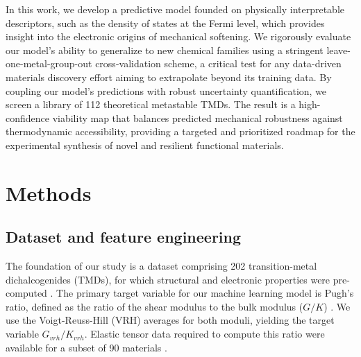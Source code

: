 \documentclass[]{article}
\begin{document}
In this work, we develop a predictive model founded on physically interpretable descriptors, such as the density of states at the Fermi level, which provides insight into the electronic origins of mechanical softening.\citep{Duan_2025,chen2025universalmaterialpropertyprediction,Zhang_2023} We rigorously evaluate our model's ability to generalize to new chemical families using a stringent leave-one-metal-group-out cross-validation scheme, a critical test for any data-driven materials discovery effort aiming to extrapolate beyond its training data.\citep{veillon2025chemicallygroundedevaluationframework} By coupling our model's predictions with robust uncertainty quantification\citep{Guan_2019}, we screen a library of 112 theoretical metastable TMDs.\citep{park2024exploring,Gou_2024} The result is a high-confidence viability map that balances predicted mechanical robustness against thermodynamic accessibility, providing a targeted and prioritized roadmap for the experimental synthesis of novel and resilient functional materials.\citep{park2024exploring,Duan_2025,Zhang_2023,Gou_2024,Gao_2025}

\section{Methods}
\label{sec:methods}
\subsection{Dataset and feature engineering}
The foundation of our study is a dataset comprising 202 transition-metal dichalcogenides (TMDs), for which structural and electronic properties were pre-computed \citep{muller2023open,Ramanathan_2023,chen2021leveraginglargescalecomputationaldatabase}. The primary target variable for our machine learning model is Pugh's ratio, defined as the ratio of the shear modulus to the bulk modulus ($G/K$) \citep{dejong2018statistical,malakar2022datadrivenmachinelearningpredict,Ali_2024}. We use the Voigt-Reuss-Hill (VRH) averages for both moduli, yielding the target variable $G_{vrh}/K_{vrh}$. Elastic tensor data required to compute this ratio were available for a subset of 90 materials \citep{dejong2018statistical,Choudhary_2020,muller2023open}.
\end{document}
